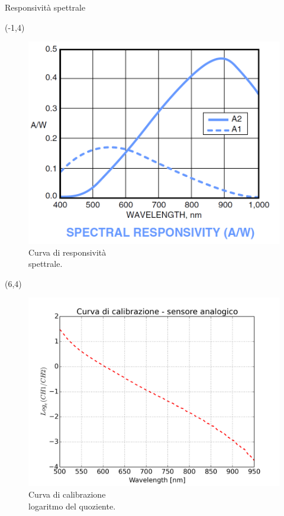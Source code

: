 \documentclass{beamer}
\begin{document}
\begin{frame}{Responsività spettrale}
\begin{textblock}{10}(-1,4)
\begin{figure}
\centering
\includegraphics[width=0.6\linewidth]{./spectral_respo}
\caption{Curva di responsività \\
spettrale.}
\label{fig:spectral_resp}
\end{figure}
\end{textblock}

\begin{textblock}{10}(6,4)
\begin{figure}
\centering
\includegraphics[width=0.6\linewidth]{./calibrazione_analog}
\caption{Curva di calibrazione \\
logaritmo del quoziente.}
\label{fig:calibr_logaritmo}
\end{figure}
\end{textblock}

\end{frame}
\end{document}
